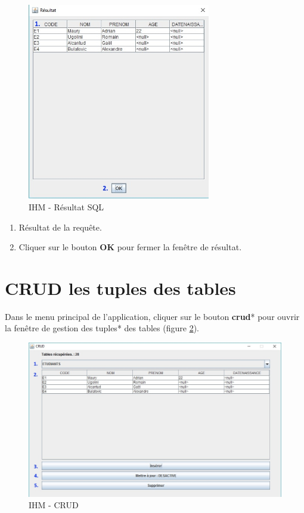 \begin{figure}[!h]
\centering
\includegraphics[width=8cm]{./images/manuel/sql_result.jpg}
\caption{IHM - Résultat SQL}
\label{sql_result_gui}
\end{figure}

\begin{enumerate}
\item Résultat de la requ\^ete.
\item Cliquer sur le bouton \textbf{OK} pour fermer la fenêtre de résultat.
\end{enumerate}

\section{CRUD les tuples des tables}
Dans le menu principal de l'application, cliquer sur le bouton \textbf{\gls{crud}}* pour ouvrir la fen\^etre de gestion des \glspl{tuple}* des tables (figure \ref{crud_gui}).
\begin{figure}[!h]
\centering
\includegraphics[width=12cm]{./images/manuel/crud.jpg}
\caption{IHM - CRUD}
\label{crud_gui}
\end{figure}

